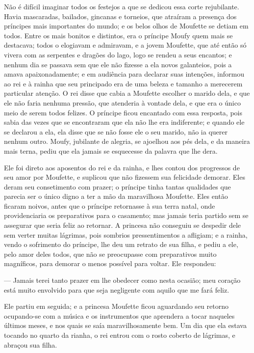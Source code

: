 Não é difícil imaginar todos os festejos a que se dedicou essa corte
rejubilante. Havia mascaradas, bailados, gincanas e torneios, que
atraíram a presença dos príncipes mais importantes do mundo; e os
belos olhos de Moufette se detiam em todos. Entre os mais bonitos e
distintos, era o príncipe Moufy quem mais se destacava; todos o
elogiavam e admiravam, e a jovem Moufette, que até então só vivera
com as serpentes e dragões do lago, logo se rendeu a seus encantos; e
nenhum dia se passava sem que ele não fizesse a ela novos galanteios,
pois a amava apaixonadamente; e em audiência para declarar suas
intenções, informou ao rei e à rainha que seu principado era de uma
beleza e tamanho a merecerem particular atenção. O rei disse que
cabia a Moufette escolher o marido dela, e que ele não faria nenhuma
pressão, que atenderia à vontade dela, e que era o único meio de
serem todos felizes. O príncipe ficou encantado com essa resposta,
pois sabia das vezes que se encontraram que ela não lhe era
indiferente; e quando ele se declarou a ela, ela disse que se não
fosse ele o seu marido, não ia querer nenhum outro. Moufy, jubilante
de alegria, se ajoelhou aos pés dela, e da maneira mais terna, pediu
que ela jamais se esquecesse da palavra que lhe dera. 

Ele foi direto aos aposentos do rei e da rainha, e lhes contou dos
progressos de seu amor por Moufette, e suplicou que não fizessem sua
felicidade demorar. Eles deram seu consetimento com prazer; o
príncipe tinha tantas qualidades que parecia ser o único digno a ter
a mão da maravilhosa Moufette. Eles então ficaram noivos, antes que o
príncipe retornasse à sua terra natal, onde providenciaria os
preparativos para o casamento; mas jamais teria partido sem se
assegurar que seria feliz ao retornar. A princesa não conseguiu se
despedir dele sem verter muitas lágrimas, pois sombrios
pressentimentos a afligiam; e a rainha, vendo o sofrimento do
príncipe, lhe deu um retrato de sua filha, e pediu a ele, pelo amor
deles todos, que não se preocupasse com preparativos muito
magníficos, para demorar o menos possível para voltar. Ele respondeu:

— Jamais terei tanto prazer em lhe obedecer como nesta ocasião; meu
coração está muito envolvido para que seja negligente com aquilo que
me fará feliz. 

Ele partiu em seguida; e a princesa Moufette ficou aguardando seu
retorno ocupando-se com a música e os instrumentos que aprendera a
tocar naqueles últimos meses, e nos quais se saía maravilhosamente
bem. Um dia que ela estava tocando no quarto da rianha, o rei entrou
com o rosto coberto de lágrimas, e abraçou sua filha.

